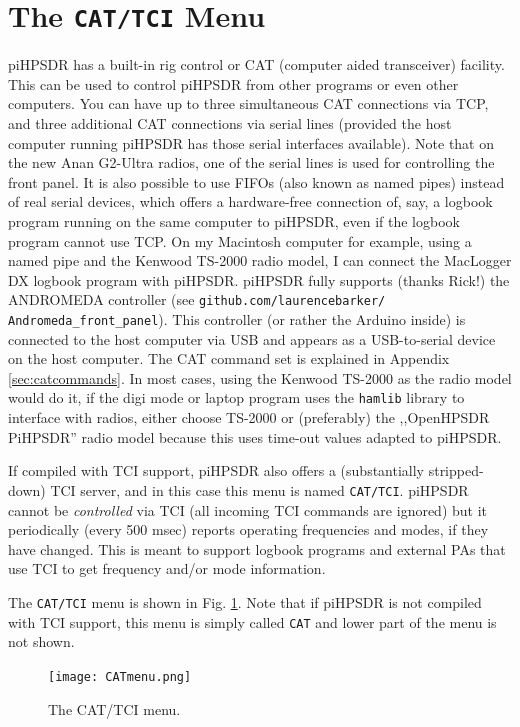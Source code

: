 \documentclass[12pt]{book}
\def\bltt#1{\texttt{\color{blue}#1}}
\def\pH{pi\-HPSDR\xspace}
\begin{document}
\section{The \texttt{CAT/TCI} Menu}

\pH has a built-in rig control or CAT (computer aided transceiver) facility. This can be used to control
\pH from other programs or even other computers. You can have up to three simultaneous CAT connections
via TCP, and three additional CAT connections via serial lines (provided the host computer running \pH
has those serial interfaces available). Note that on the new Anan G2-Ultra radios, one of the serial lines
is used for controlling the front panel.
It is also possible to use FIFOs (also known as named pipes) instead of real serial devices, which offers a
hardware-free connection
of, say, a logbook program running on the same computer to \pH, even if the logbook program cannot use
TCP. On my Macintosh computer for example, using a named pipe and the Kenwood TS-2000 radio model,
I can connect the MacLogger DX logbook program with \pH.
\pH fully supports (thanks Rick!) the ANDROMEDA controller (see \texttt{github.com/laurencebarker/
Andromeda\_front\_panel}).
This controller (or rather the Arduino inside) is connected to the host computer via USB and appears as a
USB-to-serial
device on the host computer. The CAT command set is explained in Appendix \ref{sec:catcommands}. In most
cases, using
the Kenwood TS-2000 as the radio model would do it, if the digi mode or laptop program uses the
\texttt{hamlib} library  to interface with
radios, either choose TS-2000 or (preferably) the ,,OpenHPSDR PiHPSDR'' radio model because this
uses time-out values adapted to \pH.

If compiled  with TCI  support, \pH also offers a (substantially  stripped-down) TCI server, and in this
case this menu is named \bltt{CAT/TCI}. \pH cannot
be \textit{controlled} via TCI (all incoming TCI commands are  ignored) but it periodically (every 500 msec)
reports operating frequencies  and modes, if they have changed. This is meant  to support  logbook programs
and external PAs that use TCI  to get frequency and/or mode information.

The \bltt{CAT/TCI} menu is shown in Fig. \ref{fig:CATmenu}. Note that if \pH  is  not compiled
with TCI support,  this menu is simply called  \bltt{CAT} and lower part  of the menu is not shown.

\begin{figure}[ht]
\center
\texttt{[image: CATmenu.png]}
\caption{The CAT/TCI  menu.}
\label{fig:CATmenu}
\end{figure}
\end{document}
